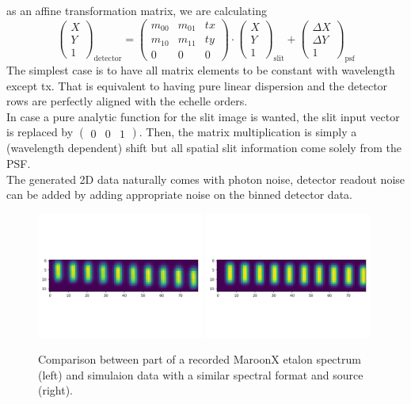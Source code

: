\documentclass[modern]{aastex61}
\begin{document}
as an affine transformation matrix, we are calculating
\begin{equation}
    \begin{pmatrix} X \\ Y \\ 1 \end{pmatrix}_{\text{detector}} =
    \begin{pmatrix} m_{00} & m_{01} & tx \\ m_{10} & m_{11} & ty \\ 0 & 0 & 0 \end{pmatrix} \cdot
    \begin{pmatrix} X \\ Y \\ 1 \end{pmatrix}_{\text{slit}} +
    \begin{pmatrix} \Delta X \\ \Delta Y \\ 1 \end{pmatrix}_{\text{psf}}
\end{equation}
The simplest case is to have all matrix elements to be constant with wavelength except tx. That is equivalent to having pure linear dispersion and the detector rows
are perfectly aligned with the echelle orders.\\
In case a pure analytic function for the slit image is wanted, the slit input vector is replaced by $\begin{pmatrix} 0 & 0 & 1 \end{pmatrix}$. 
Then, the matrix multiplication is simply a (wavelength dependent) shift but all spatial slit information come solely from the PSF.\\
The generated 2D data naturally comes with photon noise, detector readout noise can be added by adding appropriate noise on the binned detector data.
\begin{figure}
    \includegraphics[width=0.49\textwidth]{img/maroonx_data.png}
    \includegraphics[width=0.49\textwidth]{img/simulator_data.png}
    \caption{Comparison between part of a recorded MaroonX etalon spectrum (left) and simulaion data with a similar spectral format and source (right).}
\end{figure}
\end{document}
